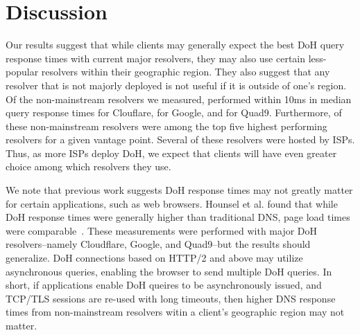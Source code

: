 \section{Discussion}\label{sec:discussion}
Our results suggest that while clients may generally expect the best DoH query response times with current major resolvers, they may also use certain less-popular resolvers within their geographic region.
They also suggest that any resolver that is not majorly deployed is not useful if it is outside of one's region.
Of the  non-mainstream resolvers we measured,  performed within 10ms in median query response times for Clouflare,  for Google, and  for Quad9.
Furthermore,  of these non-mainstream resolvers were among the top five highest performing resolvers for a given vantage point.
Several of these resolvers were hosted by ISPs.
Thus, as more ISPs deploy DoH, we expect that clients will have even greater choice among which resolvers they use.

We note that previous work suggests DoH response times may not greatly matter for certain applications, such as web browsers.
Hounsel et al. found that while DoH response times were generally higher than traditional DNS, page load times were comparable~\cite{hounsel2020comparing}.
These measurements were performed with major DoH resolvers--namely Cloudflare, Google, and Quad9--but the results should generalize.
DoH connections based on HTTP/2 and above may utilize asynchronous queries, enabling the browser to send multiple DoH queries.
In short, if applications enable DoH queires to be asynchronously issued, and TCP/TLS sessions are re-used with long timeouts, then higher DNS response times from non-mainstream resolvers witin a client's geographic region may not matter.
